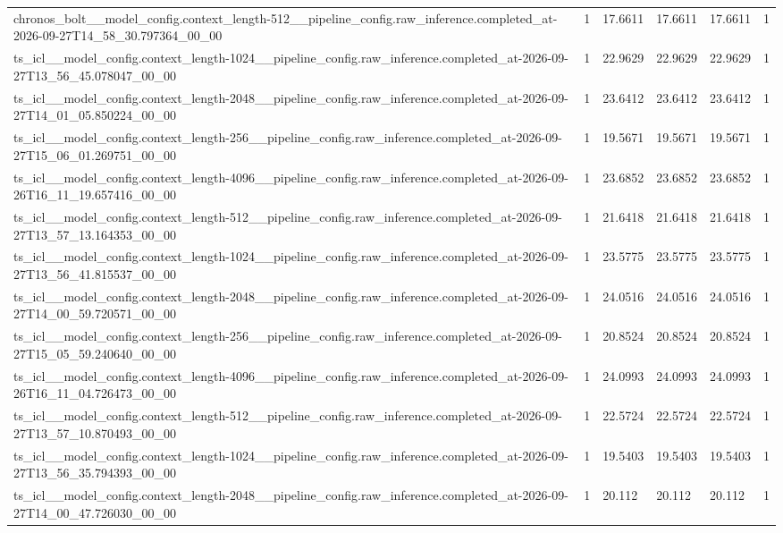 \begin{tabular}{llllll}
chronos\_bolt\_\_model\_config.context\_length-512\_\_pipeline\_config.raw\_inference.completed\_at-2026-09-27T14\_58\_30.797364\_00\_00 & 1 & 17.6611 & 17.6611 & 17.6611 & 1 \\
ts\_icl\_\_model\_config.context\_length-1024\_\_pipeline\_config.raw\_inference.completed\_at-2026-09-27T13\_56\_45.078047\_00\_00 & 1 & 22.9629 & 22.9629 & 22.9629 & 1 \\
ts\_icl\_\_model\_config.context\_length-2048\_\_pipeline\_config.raw\_inference.completed\_at-2026-09-27T14\_01\_05.850224\_00\_00 & 1 & 23.6412 & 23.6412 & 23.6412 & 1 \\
ts\_icl\_\_model\_config.context\_length-256\_\_pipeline\_config.raw\_inference.completed\_at-2026-09-27T15\_06\_01.269751\_00\_00 & 1 & 19.5671 & 19.5671 & 19.5671 & 1 \\
ts\_icl\_\_model\_config.context\_length-4096\_\_pipeline\_config.raw\_inference.completed\_at-2026-09-26T16\_11\_19.657416\_00\_00 & 1 & 23.6852 & 23.6852 & 23.6852 & 1 \\
ts\_icl\_\_model\_config.context\_length-512\_\_pipeline\_config.raw\_inference.completed\_at-2026-09-27T13\_57\_13.164353\_00\_00 & 1 & 21.6418 & 21.6418 & 21.6418 & 1 \\
ts\_icl\_\_model\_config.context\_length-1024\_\_pipeline\_config.raw\_inference.completed\_at-2026-09-27T13\_56\_41.815537\_00\_00 & 1 & 23.5775 & 23.5775 & 23.5775 & 1 \\
ts\_icl\_\_model\_config.context\_length-2048\_\_pipeline\_config.raw\_inference.completed\_at-2026-09-27T14\_00\_59.720571\_00\_00 & 1 & 24.0516 & 24.0516 & 24.0516 & 1 \\
ts\_icl\_\_model\_config.context\_length-256\_\_pipeline\_config.raw\_inference.completed\_at-2026-09-27T15\_05\_59.240640\_00\_00 & 1 & 20.8524 & 20.8524 & 20.8524 & 1 \\
ts\_icl\_\_model\_config.context\_length-4096\_\_pipeline\_config.raw\_inference.completed\_at-2026-09-26T16\_11\_04.726473\_00\_00 & 1 & 24.0993 & 24.0993 & 24.0993 & 1 \\
ts\_icl\_\_model\_config.context\_length-512\_\_pipeline\_config.raw\_inference.completed\_at-2026-09-27T13\_57\_10.870493\_00\_00 & 1 & 22.5724 & 22.5724 & 22.5724 & 1 \\
ts\_icl\_\_model\_config.context\_length-1024\_\_pipeline\_config.raw\_inference.completed\_at-2026-09-27T13\_56\_35.794393\_00\_00 & 1 & 19.5403 & 19.5403 & 19.5403 & 1 \\
ts\_icl\_\_model\_config.context\_length-2048\_\_pipeline\_config.raw\_inference.completed\_at-2026-09-27T14\_00\_47.726030\_00\_00 & 1 & 20.112 & 20.112 & 20.112 & 1 \\

\end{tabular}
